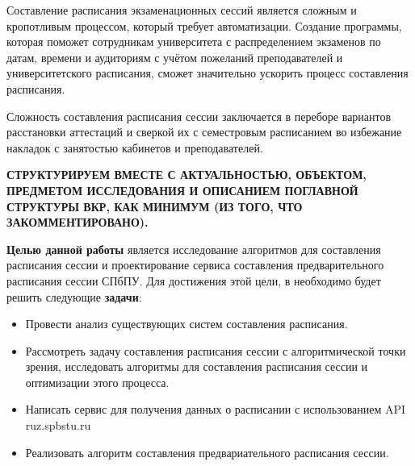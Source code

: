 Составление расписания экзаменационных сессий является сложным и кропотливым процессом, который требует автоматизации. Создание программы, которая поможет сотрудникам университета с распределением экзаменов по датам, времени и аудиториям с учётом пожеланий преподавателей и университетского расписания, сможет значительно ускорить процесс составления расписания. %

Сложность составления расписания сессии заключается в переборе вариантов расстановки аттестаций и сверкой их с семестровым расписанием во избежание накладок с занятостью кабинетов и преподавателей. 

\textbf{СТРУКТУРИРУЕМ ВМЕСТЕ С АКТУАЛЬНОСТЬЮ, ОБЪЕКТОМ, ПРЕДМЕТОМ ИССЛЕДОВАНИЯ И ОПИСАНИЕМ ПОГЛАВНОЙ СТРУКТУРЫ ВКР, КАК МИНИМУМ (ИЗ ТОГО, ЧТО ЗАКОММЕНТИРОВАНО).}

\textbf{Целью данной работы} является исследование алгоритмов для составления расписания сессии и проектирование сервиса составления предварительного расписания сессии СПбПУ.
Для достижения этой цели, в необходимо будет решить следующие \textbf{задачи}:

\begin{itemize}
	\item Провести анализ существующих систем составления расписания.
	\item Рассмотреть задачу составления расписания сессии с алгоритмической точки зрения, исследовать алгоритмы для составления расписания сессии и оптимизации этого процесса.
	\item Написать сервис для получения данных о расписании с использованием API ruz.spbstu.ru
	\item Реализовать алгоритм составления предвариательного расписания сессии. %
\end{itemize}
